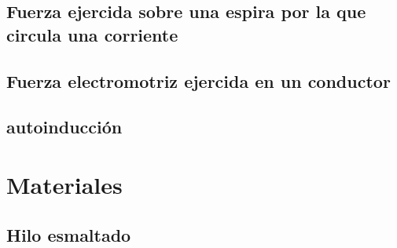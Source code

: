 \documentclass{report}
\begin{document}
  \subsection{Fuerza ejercida sobre una espira por la que circula una corriente}\label{ssec:fuerza_espira}


  \subsection{Fuerza electromotriz ejercida en un conductor}\label{ssec:fuerza_electromotriz_conductor}

  \subsection{autoinducción}\label{ssec:autoinducción}


\label{chap:2}

  \section{Materiales}\label{sec:materiales}
    \vspace{2em}
    \subsection{Hilo esmaltado}\label{ssec:hilo_esmaltado}
    
\end{document}
